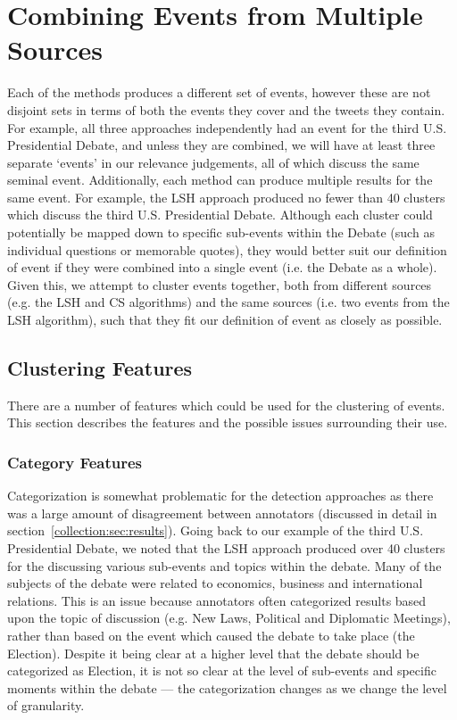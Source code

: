 
\section{Combining Events from Multiple Sources}
\label{sec:merge}
Each of the methods produces a different set of events, however these are not disjoint sets in terms of both the events they cover and the tweets they contain.
For example, all three approaches independently had an event for the third U.S. Presidential Debate, and unless they are combined, we will have at least three separate `events' in our relevance judgements, all of which discuss the same seminal event.
Additionally, each method can produce multiple results for the same event.
For example, the LSH approach produced no fewer than 40 clusters which discuss the third U.S. Presidential Debate. Although each cluster could potentially be mapped down to specific sub-events within the Debate (such as individual questions or memorable quotes), they would better suit our definition of event if they were combined into a single event (i.e. the Debate as a whole).
Given this, we attempt to cluster events together, both from different sources (e.g. the LSH and CS algorithms) and the same sources (i.e. two events from the LSH algorithm), such that they fit our definition of event as closely as possible.

\subsection{Clustering Features}
There are a number of features which could be used for the clustering of events.
This section describes the features and the possible issues surrounding their use.

\subsubsection{Category Features}
Categorization is somewhat problematic for the detection approaches as there was a large amount of disagreement between annotators (discussed in detail in section~\ref{collection:sec:results}).
Going back to our example of the third U.S. Presidential Debate, we noted that the LSH approach produced over 40 clusters for the discussing various sub-events and topics within the debate.
Many of the subjects of the debate were related to economics, business and international relations.
This is an issue because annotators often categorized results based upon the topic of discussion (e.g. New Laws, Political and Diplomatic Meetings), rather than based on the event which caused the debate to take place (the Election).
Despite it being clear at a higher level that the debate should be categorized as Election, it is not so clear at the level of sub-events and specific moments within the debate --- the categorization changes as we change the level of granularity.

